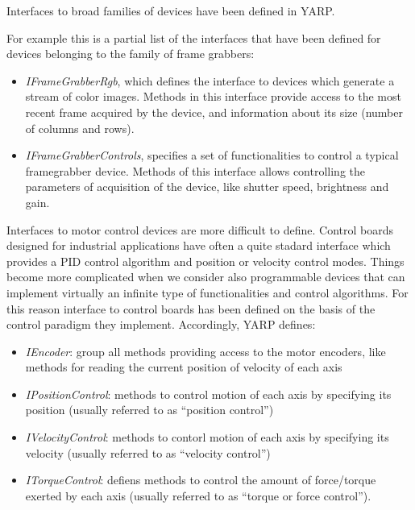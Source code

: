 Interfaces to broad families of devices have been defined in YARP. 

For example this is a partial list of the interfaces that have been defined for 
devices belonging to the family of frame grabbers:

\begin{itemize}

\item \emph{IFrameGrabberRgb}, which defines the interface to devices which generate 
a stream of color images. Methods in this interface provide access to the most 
recent frame acquired by the device, and information about its size (number of 
columns and rows).

\item \emph{IFrameGrabberControls}, specifies a set of functionalities to control 
a typical framegrabber device. Methods of this interface allows controlling the 
parameters of acquisition of the device, like shutter speed, brightness and gain.

\end{itemize}

Interfaces to motor control devices are more difficult to define. Control boards 
designed for industrial applications have often a quite stadard interface which 
provides a PID control algorithm and position or velocity control modes. Things 
become more complicated when we consider also programmable devices that can 
implement virtually an infinite type of functionalities and control algorithms. 
For this reason interface to control boards has been defined on the basis of 
the control paradigm they implement. Accordingly, YARP defines:

\begin{itemize}

\item \emph{IEncoder}: group all methods providing access to the motor encoders, 
like methods for reading the current position of velocity of each axis

\item \emph{IPositionControl}: methods to control motion of each axis by specifying 
its position (usually referred to as ``position control'')

\item \emph{IVelocityControl}: methods to contorl motion of each axis by specifying 
its velocity (usually referred to as ``velocity control'')

\item \emph{ITorqueControl}: defiens methods to control the amount of force/torque 
exerted by each axis (usually referred to as ``torque or force control'').

\end{itemize}

